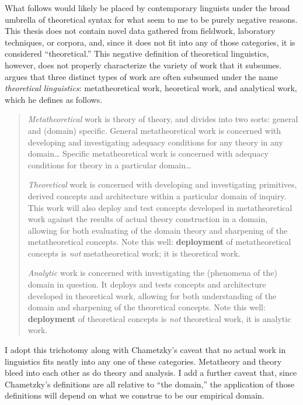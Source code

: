 \documentclass[MilwayThesis]{subfiles}
\begin{document}
What follows would likely be placed by contemporary linguists under the broad umbrella of theoretical syntax for what seem to me to be purely negative reasons.
This thesis does not contain novel data gathered from fieldwork, laboratory techniques, or corpora, and, since it does not fit into any of those categories, it is considered ``theoretical.''
This negative definition of theoretical linguistics, however, does not properly characterize the variety of work that it subsumes.
\textcite{chametzky1996theory} argues that three distinct types of work are often subsumed under the name \textit{theoretical linguistics}: metatheoretical work, heoretical work, and analytical work, which he defines as follows.
\begin{quotation}
	\textit{Metatheoretical} work is theory of theory, and divides into two sorts: general and (domain) specific. 
	General metatheoretical work is concerned with developing and investigating adequacy conditions for any theory in any domain\dots
	Specific metatheoretical work is concerned with adequacy conditions for theory in a particular domain\dots

	\textit{Theoretical} work is concerned with developing and investigating primitives, derived concepts and architecture within a particular domain of inquiry.
	This work will also deploy and test concepts developed in metatheoretical work against the results of actual theory construction in a domain, allowing for both evaluating of the domain theory and sharpening of the metatheoretical concepts.
	Note this well: \textbf{deployment} of metatheoretical concepts is \textit{not} metatheoretical work; it is theoretical work.

	\textit{Analytic} work is concerned with investigating the (phenomena of the) domain in question.
	It deploys and tests concepts and architecture developed in theoretical work, allowing for both understanding of the domain and sharpening of the theoretical concepts.
	Note this well: \textbf{deployment} of theoretical concepts is \textit{not} theoretical work, it is analytic work.
\end{quotation}
I adopt this trichotomy along with Chametzky's caveat that no actual work in linguistics fits neatly into any one of these categories.
Metatheory and theory bleed into each other as do theory and analysis.
I add a further caveat that, since Chametzky's definitions are all relative to ``the domain,'' the application of those definitions will depend on what we construe to be our empirical domain.
\end{document}
